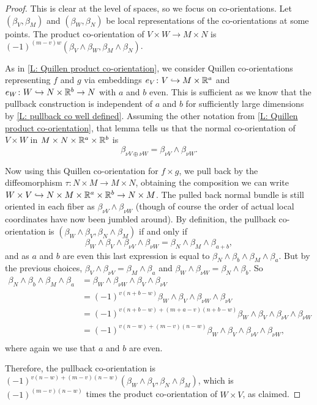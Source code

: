 \begin{proof}
	This is clear at the level of spaces, so we focus on co-orientations.
	Let $(\beta_V,\beta_M)$ and $(\beta_W,\beta_N)$ be local representations of the co-orientations at some points.
	The product co-orientation of $V \times W \to M \times N$ is $(-1)^{(m-v)w}(\beta_V \wedge \beta_W,\beta_M \wedge \beta_N)$.

	As in \cref{L: Quillen product co-orientation}, we consider Quillen co-orientations representing $f$ and $g$ via embeddings $e_V \colon V \hookrightarrow M \times \mathbb{R}^a$ and $e_W \colon W \hookrightarrow N \times \mathbb{R}^b \to N$ with $a$ and $b$ even.
	This is sufficient as we know that the pullback construction is independent of $a$ and $b$ for sufficiently large dimensions by \cref{L: pullback co well defined}.
	Assuming the other notation from \cref{L: Quillen product co-orientation}, that lemma tells us that the normal co-orientation of $V \times W$ in $M \times N \times \mathbb{R}^a \times \mathbb{R}^b$ is $$\beta_{\nu V \oplus \nu W} = \beta_{\nu V} \wedge \beta_{\nu W}.$$

	Now using this Quillen co-orientation for $f \times g$, we pull back by the diffeomorphism $\tau \colon N \times M \to M \times N$, obtaining the composition we can write $W \times V \hookrightarrow N \times M \times \mathbb{R}^a \times \mathbb{R}^b \to N \times M$.
	The pulled back normal bundle is still oriented in each fiber as $\beta_{\nu V} \wedge \beta_{\nu W}$ (though of course the order of actual local coordinates have now been jumbled around).
	By definition, the pullback co-orientation is $(\beta_W \wedge \beta_V,\beta_N \wedge \beta_M)$ if and only if $$\beta_W \wedge \beta_V \wedge \beta_{\nu V} \wedge \beta_{\nu W} = \beta_N \wedge \beta_M \wedge \beta_{a+b},$$
	and as $a$ and $b$ are even this last expression is equal to
	$\beta_N \wedge \beta_b \wedge \beta_M \wedge \beta_{a}.$ But by the previous choices, $\beta_V \wedge \beta_{\nu V} = \beta_M \wedge \beta_a$ and $\beta_W \wedge \beta_{\nu W} = \beta_N \wedge \beta_b$.
	So
	\begin{align*}
		\beta_N \wedge \beta_b \wedge \beta_M \wedge \beta_{a}
		& = \beta_W \wedge \beta_{\nu W} \wedge \beta_V \wedge \beta_{\nu V} \\
		& = (-1)^{v(n+b-w)}\beta_W \wedge \beta_V \wedge \beta_{\nu W} \wedge \beta_{\nu V} \\
		& = (-1)^{v(n+b-w)+(m+a-v)(n+b-w)}\beta_W \wedge \beta_V \wedge \beta_{\nu V} \wedge \beta_{\nu W} \\
		& = (-1)^{v(n-w)+(m-v)(n-w)}\beta_W \wedge \beta_V \wedge \beta_{\nu V} \wedge \beta_{\nu W}, \\
	\end{align*}
	where again we use that $a$ and $b$ are even.

	Therefore, the pullback co-orientation is $(-1)^{v(n-w)+(m-v)(n-w)}(\beta_W \wedge \beta_V,\beta_N \wedge \beta_M)$, which is $(-1)^{(m-v)(n-w)}$ times the product co-orientation of $W \times V$, as claimed.
\end{proof}

